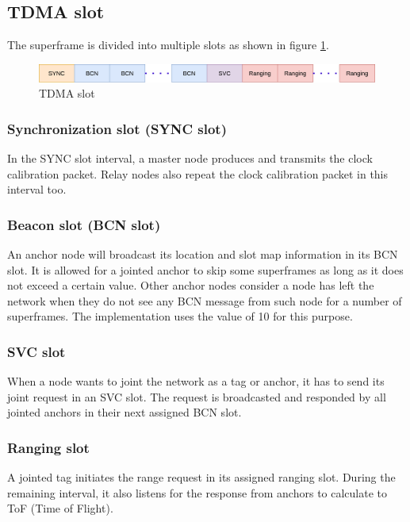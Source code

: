 \documentclass[../../main.tex]{subfiles}
\begin{document}
\subsection{TDMA slot}
The superframe is divided into multiple slots as shown in figure \ref{fig:tdma_slot}.
\begin{figure}[H]
    \begin{center}
        \includegraphics[scale=0.4]{tdma_slot.png}
    \end{center}
    \caption{TDMA slot}
    \label{fig:tdma_slot}
\end{figure}

\subsubsection{Synchronization slot (SYNC slot)}
In the SYNC slot interval, a master node produces and transmits the clock calibration packet. Relay nodes also repeat the clock calibration packet in this interval too.
\subsubsection{Beacon slot (BCN slot)}
An anchor node will broadcast its location and slot map information in its BCN slot. It is allowed for a jointed anchor to skip some superframes as long as it does not exceed a certain value. Other anchor nodes consider a node has left the network when they do not see any BCN message from such node for a number of superframes. The implementation uses the value of 10 for this purpose.
\subsubsection{SVC slot}
When a node wants to joint the network as a tag or anchor, it has to send its joint request in an SVC slot. The request is broadcasted and responded by all jointed anchors in their next assigned BCN slot.
\subsubsection{Ranging slot}
A jointed tag initiates the range request in its assigned ranging slot. During the remaining interval, it also listens for the response from anchors to calculate to ToF (Time of Flight).
\end{document}
